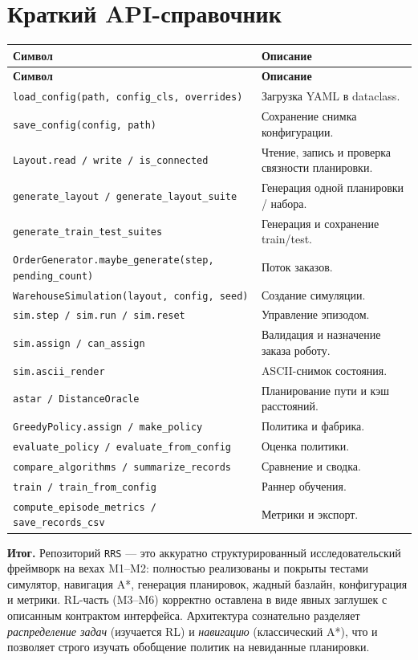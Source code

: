 \documentclass[11pt,a4paper]{article}
\newcommand{\code}[1]{\texttt{#1}}
\begin{document}
\section{Краткий API-справочник}
\begin{longtable}{@{}p{}p{}@{}}
\toprule
\textbf{Символ} & \textbf{Описание} \\
\midrule
\endfirsthead
\toprule
\textbf{Символ} & \textbf{Описание} \\
\midrule
\endhead
\code{load\_config(path, config\_cls, overrides)} & Загрузка YAML в dataclass. \\
\code{save\_config(config, path)} & Сохранение снимка конфигурации. \\
\code{Layout.read / write / is\_connected} & Чтение, запись и проверка
связности планировки. \\
\code{generate\_layout / generate\_layout\_suite} & Генерация одной планировки /
набора. \\
\code{generate\_train\_test\_suites} & Генерация и сохранение train/test. \\
\code{OrderGenerator.maybe\_generate(step, pending\_count)} & Поток заказов. \\
\code{WarehouseSimulation(layout, config, seed)} & Создание симуляции. \\
\code{sim.step / sim.run / sim.reset} & Управление эпизодом. \\
\code{sim.assign / can\_assign} & Валидация и назначение заказа роботу. \\
\code{sim.ascii\_render} & ASCII-снимок состояния. \\
\code{astar / DistanceOracle} & Планирование пути и кэш расстояний. \\
\code{GreedyPolicy.assign / make\_policy} & Политика и фабрика. \\
\code{evaluate\_policy / evaluate\_from\_config} & Оценка политики. \\
\code{compare\_algorithms / summarize\_records} & Сравнение и сводка. \\
\code{train / train\_from\_config} & Раннер обучения. \\
\code{compute\_episode\_metrics / save\_records\_csv} & Метрики и экспорт. \\
\bottomrule
\end{longtable}

\vfill
\begin{tcolorbox}[colback=accent!5,colframe=accent!60]
\textbf{Итог.} Репозиторий \code{RRS} — это аккуратно структурированный
исследовательский фреймворк на вехах M1--M2: полностью реализованы и покрыты
тестами симулятор, навигация A*, генерация планировок, жадный базлайн,
конфигурация и метрики. RL-часть (M3--M6) корректно оставлена в виде явных
заглушек с описанным контрактом интерфейса. Архитектура сознательно разделяет
\emph{распределение задач} (изучается RL) и \emph{навигацию} (классический A*),
что и позволяет строго изучать обобщение политик на невиданные планировки.
\end{tcolorbox}
\end{document}
